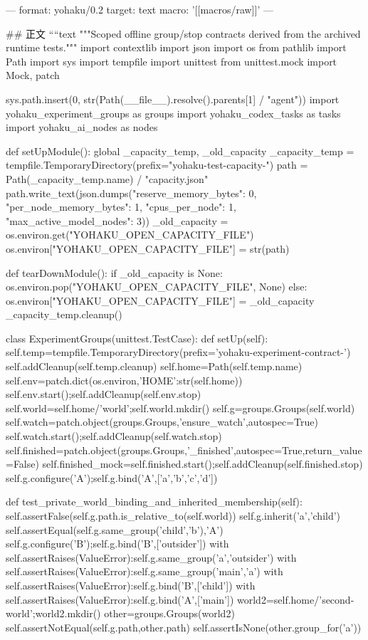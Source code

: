 ---
format: yohaku/0.2
target: text
macro: '[[macros/raw]]'
---

## 正文
````text
"""Scoped offline group/stop contracts derived from the archived runtime tests."""
import contextlib
import json
import os
from pathlib import Path
import sys
import tempfile
import unittest
from unittest.mock import Mock, patch

sys.path.insert(0, str(Path(__file__).resolve().parents[1] / "agent"))
import yohaku_experiment_groups as groups
import yohaku_codex_tasks as tasks
import yohaku_ai_nodes as nodes

def setUpModule():
 global _capacity_temp, _old_capacity
 _capacity_temp = tempfile.TemporaryDirectory(prefix="yohaku-test-capacity-")
 path = Path(_capacity_temp.name) / "capacity.json"
 path.write_text(json.dumps({"reserve_memory_bytes": 0, "per_node_memory_bytes": 1, "cpus_per_node": 1, "max_active_model_nodes": 3}))
 _old_capacity = os.environ.get("YOHAKU_OPEN_CAPACITY_FILE")
 os.environ["YOHAKU_OPEN_CAPACITY_FILE"] = str(path)

def tearDownModule():
 if _old_capacity is None: os.environ.pop("YOHAKU_OPEN_CAPACITY_FILE", None)
 else: os.environ["YOHAKU_OPEN_CAPACITY_FILE"] = _old_capacity
 _capacity_temp.cleanup()

class ExperimentGroups(unittest.TestCase):
 def setUp(self):
   self.temp=tempfile.TemporaryDirectory(prefix='yohaku-experiment-contract-')
   self.addCleanup(self.temp.cleanup)
   self.home=Path(self.temp.name)
   self.env=patch.dict(os.environ,{'HOME':str(self.home)})
   self.env.start();self.addCleanup(self.env.stop)
   self.world=self.home/'world';self.world.mkdir()
   self.g=groups.Groups(self.world)
   self.watch=patch.object(groups.Groups,'ensure_watch',autospec=True)
   self.watch.start();self.addCleanup(self.watch.stop)
   self.finished=patch.object(groups.Groups,'_finished',autospec=True,return_value=False)
   self.finished_mock=self.finished.start();self.addCleanup(self.finished.stop)
   self.g.configure('A');self.g.bind('A',['a','b','c','d'])

 def test_private_world_binding_and_inherited_membership(self):
   self.assertFalse(self.g.path.is_relative_to(self.world))
   self.g.inherit('a','child')
   self.assertEqual(self.g.same_group('child','b'),'A')
   self.g.configure('B');self.g.bind('B',['outsider'])
   with self.assertRaises(ValueError):self.g.same_group('a','outsider')
   with self.assertRaises(ValueError):self.g.same_group('main','a')
   with self.assertRaises(ValueError):self.g.bind('B',['child'])
   with self.assertRaises(ValueError):self.g.bind('A',['main'])
   world2=self.home/'second-world';world2.mkdir()
   other=groups.Groups(world2)
   self.assertNotEqual(self.g.path,other.path)
   self.assertIsNone(other.group_for('a'))

